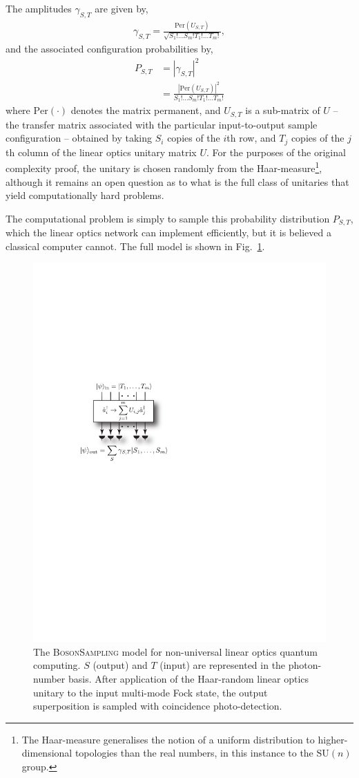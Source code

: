 \documentclass[aps, rmp, twocolumn, amsmath, amssymb, nofootinbib, superscriptaddress, longbibliography, floatfix, table-of-contents, eqsecnum]{revtex4-1}
\begin{document}
The amplitudes $\gamma_{S,T}$ are given by,
\begin{align}
	\gamma_{S,T} = \frac{\text{Per}(U_{S,T})}{\sqrt{S_1!\dots S_m! T_1!\dots T_m!}},
\end{align}
and the associated configuration probabilities by,
\begin{align}
	P_{S,T} &= |\gamma_{S,T}|^2 \nonumber \\
	&= \frac{|\text{Per}(U_{S,T})|^2}{S_1!\dots S_m! T_1!\dots T_m!}
\end{align}
where $\text{Per}(\cdot)$ denotes the matrix permanent, and $U_{S,T}$ is a sub-matrix of $U$ -- the transfer matrix associated with the particular input-to-output sample configuration -- obtained by taking $S_i$ copies of the $i$th row, and $T_j$ copies of the $j$th column of the linear optics unitary matrix $U$. For the purposes of the original complexity proof, the unitary is chosen randomly from the Haar-measure\footnote{The Haar-measure generalises the notion of a uniform distribution to higher-dimensional topologies than the real numbers, in this instance to the $\text{SU}(n)$ group.}, although it remains an open question as to what is the full class of unitaries that yield computationally hard problems.

The computational problem is simply to sample this probability distribution $P_{S,T}$, which the linear optics network can implement efficiently, but it is believed a classical computer cannot. The full model is shown in Fig.~\ref{fig:bs_model}.

\begin{figure}[!htb]
\includegraphics[width=0.7\columnwidth]{bs_model}
\caption{The \textsc{BosonSampling} model for non-universal linear optics quantum computing. $S$ (output) and $T$ (input) are represented in the photon-number basis. After application of the Haar-random linear optics unitary to the input multi-mode Fock state, the output superposition is sampled with coincidence photo-detection.} \label{fig:bs_model}
\end{figure}
\end{document}

